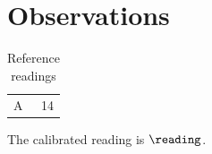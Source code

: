 \section{Observations}
\begin{table}
\caption{Reference readings}
\label{tab:reading}
\begin{tabular}{lr}A & 14\\\end{tabular}
\end{table}
The calibrated reading is $\reading$.
